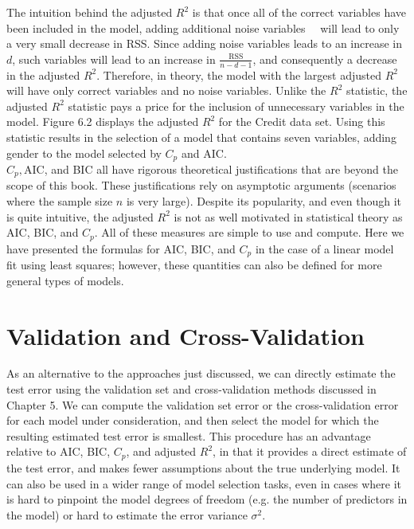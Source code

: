 \documentclass[10pt]{article}
\begin{document}
The intuition behind the adjusted $R^{2}$ is that once all of the correct variables have been included in the model, adding additional noise variables\
\
will lead to only a very small decrease in RSS. Since adding noise variables leads to an increase in $d$, such variables will lead to an increase in $\frac{\text { RSS }}{n-d-1}$, and consequently a decrease in the adjusted $R^{2}$. Therefore, in theory, the model with the largest adjusted $R^{2}$ will have only correct variables and no noise variables. Unlike the $R^{2}$ statistic, the adjusted $R^{2}$ statistic pays a price for the inclusion of unnecessary variables in the model. Figure 6.2 displays the adjusted $R^{2}$ for the Credit data set. Using this statistic results in the selection of a model that contains seven variables, adding gender to the model selected by $C_{p}$ and AIC.\\
$C_{p}, \mathrm{AIC}$, and BIC all have rigorous theoretical justifications that are beyond the scope of this book. These justifications rely on asymptotic arguments (scenarios where the sample size $n$ is very large). Despite its popularity, and even though it is quite intuitive, the adjusted $R^{2}$ is not as well motivated in statistical theory as AIC, BIC, and $C_{p}$. All of these measures are simple to use and compute. Here we have presented the formulas for AIC, BIC, and $C_{p}$ in the case of a linear model fit using least squares; however, these quantities can also be defined for more general types of models.

\section*{Validation and Cross-Validation}
As an alternative to the approaches just discussed, we can directly estimate the test error using the validation set and cross-validation methods discussed in Chapter 5. We can compute the validation set error or the cross-validation error for each model under consideration, and then select the model for which the resulting estimated test error is smallest. This procedure has an advantage relative to AIC, BIC, $C_{p}$, and adjusted $R^{2}$, in that it provides a direct estimate of the test error, and makes fewer assumptions about the true underlying model. It can also be used in a wider range of model selection tasks, even in cases where it is hard to pinpoint the model degrees of freedom (e.g. the number of predictors in the model) or hard to estimate the error variance $\sigma^{2}$.
\end{document}
